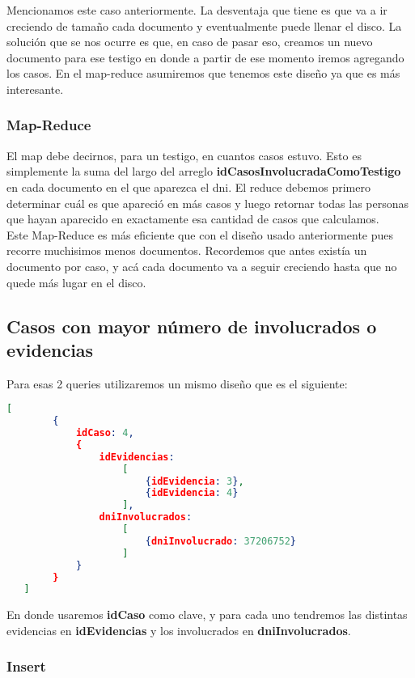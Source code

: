 \documentclass[11pt, a4paper]{article}
\begin{document}
Mencionamos este caso anteriormente. La desventaja que tiene es que va a ir creciendo de tama\~no cada documento y eventualmente puede llenar el disco. La soluci\'on que se nos ocurre es que, en caso de pasar eso, creamos un nuevo documento para ese testigo en donde a partir de ese momento iremos agregando los casos. En el map-reduce asumiremos que tenemos este dise\~no ya que es m\'as interesante.

\subsubsection{Map-Reduce}

El map debe decirnos, para un testigo, en cuantos casos estuvo. Esto es simplemente la suma del largo del arreglo \textbf{idCasosInvolucradaComoTestigo} en cada documento en el que aparezca el dni. El reduce debemos primero determinar cu\'al es que apareci\'o en m\'as casos y luego retornar todas las personas que hayan aparecido en exactamente esa cantidad de casos que calculamos.\\

Este Map-Reduce es m\'as eficiente que con el dise\~no usado anteriormente pues recorre muchisimos menos documentos. Recordemos que antes exist\'ia un documento por caso, y ac\'a cada documento va a seguir creciendo hasta que no quede m\'as lugar en el disco.

\subsection{Casos con mayor n\'umero de involucrados o evidencias}

Para esas 2 queries utilizaremos un mismo dise\~no que es el siguiente:

\begin{lstlisting}[language=json]
   [
   		{
   			idCaso: 4,
	   		{
	   			idEvidencias: 
	   				[	
	   					{idEvidencia: 3},
	   					{idEvidencia: 4}
	   				],
	   			dniInvolucrados:
	   				[
	   					{dniInvolucrado: 37206752}
	   				]
	   		}
	   	}
   ]
\end{lstlisting}

En donde usaremos \textbf{idCaso} como clave, y para cada uno tendremos las distintas evidencias en \textbf{idEvidencias} y los involucrados en \textbf{dniInvolucrados}.

\subsubsection{Insert}
\end{document}
